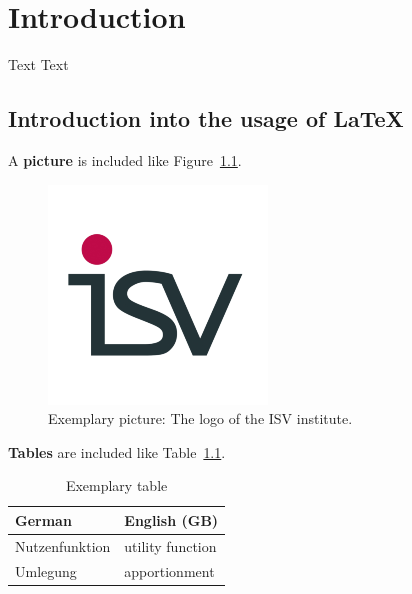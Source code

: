 %
%
\chapter{Introduction}
Text Text

\section{Introduction into the usage of LaTeX}

A \textbf{picture} is included like Figure~\ref{fig:Pic1}.
\begin{figure}[hbtp] %
\centering %
\includegraphics[scale=0.5]{Pictures/isv_logo_weiss.png} %
\caption[Exemplary picture]{Exemplary picture: The logo of the ISV institute.} %
\label{fig:Pic1} %
\end{figure}

\textbf{Tables} are included like Table~\ref{tab:tablename}.
\begin{table}[htbp]
\caption{Exemplary table}
\label{tab:tablename} %
\centering %
\begin{tabular}[c]{l|l} %
\hline
\textbf{German} & \textbf{English (GB)} \\ \hline
Nutzenfunktion & utility function \\
Umlegung & apportionment \\
\end{tabular}
\end{table}

